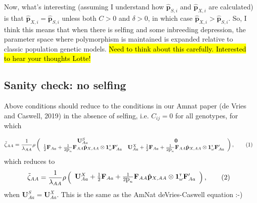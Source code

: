 \documentclass[11pt]{article}
\newcommand\numberthis{\addtocounter{equation}{1}\tag{\theequation}}
\def\mbf#1{\mathbf{#1}}
\newcommand{\tr}{{\mbox{\tiny \sf T}}}
\begin{document}
Now, what's interesting (assuming I understand how $\hat{\mbf{p}}_{S,i}$ and $\hat{\mbf{p}}_{X,i}$ are calculated) is that $\hat{\mbf{p}}_{X,i} = \hat{\mbf{p}}_{S,i}$ unless both $C > 0$ and $\delta > 0$, in which case  $\hat{\mbf{p}}_{X,i} > \hat{\mbf{p}}_{S,i}$. So, I think this means that when there is selfing and some inbreeding depression, the parameter space where polymorphism is maintained is expanded relative to classic population genetic models. \hl{Need to think about this carefully. Interested to hear your thoughts Lotte!}











\subsection*{Sanity check: no selfing}
Above conditions should reduce to the conditions in our Amnat paper (de Vries and Caswell, 2019) in the absence of selfing, i.e. $C_{ij}=0$ for all genotypes, for which

\begin{align*} \label{eq:eigAA}
	\tilde{\zeta}_{AA} = 
		\frac{1}{\lambda_{AA}}\rho\left(\begin{array}{cc}
\mathbf{U}^S_{Aa}  & \mathbf{0} \\
 \frac{1}{2} \mbf{F}_{Aa}+\frac{1}{2\mbox{p}_{n}}\mbf{F}_{AA} \hat{\mbf{p}}_{X,AA} \otimes \mathbf{1}^\tr_{\omega} \mathbf{F}_{Aa}^\prime &\mathbf{U}^X_{Aa} + \frac{1}{2} \mbf{F}_{Aa} +\frac{1}{2\mbox{p}_{n}} \mbf{F}_{AA} \hat{\mbf{p}}_{X,AA} \otimes \mathbf{1}^\tr_{\omega} \mathbf{F}_{Aa}^\prime
			\end{array} \right), \numberthis
\end{align*}
which reduces to 
\begin{align*} \label{eq:eigAA}
	\tilde{\zeta}_{AA} = 
		\frac{1}{\lambda_{AA}}\rho\left(\begin{array}{c}
\mathbf{U}^X_{Aa} + \frac{1}{2} \mbf{F}_{Aa} +\frac{1}{2\mbox{p}_{n}} \mbf{F}_{AA} \hat{\mbf{p}}_{X,AA} \otimes \mathbf{1}^\tr_{\omega} \mathbf{F}_{Aa}^\prime
			\end{array} \right), \numberthis
\end{align*}
when $\mathbf{U}^S_{Aa}=\mathbf{U}^X_{Aa}$. This is the same as the AmNat deVries-Caswell equation :-) 

\newpage
\end{document}
